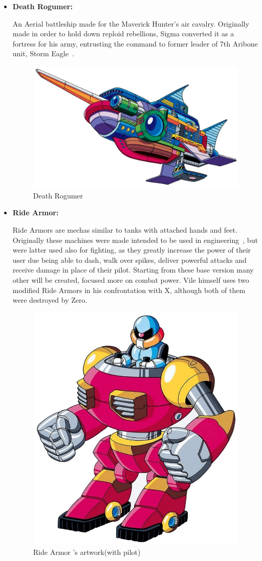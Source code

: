 \begin{itemize}
	\item \hypertarget{veichle:Death_Rogumer}{\textbf{Death Rogumer:}}
	An Aerial battleship made for the Maverick Hunter's air cavalry. Originally made in order to hold down reploid rebellions, Sigma converted it as a fortress 
	for his army, entrusting the command to former leader of 7th Aribone unit, Storm Eagle~\cite{wayback:X_resources}.
	\begin{figure}[htp]
		\centering
		\includegraphics[width=\linewidth]{figures/X1/Storm_eagle/DeathRogumer.jpg}
		\caption{Death Rogumer}
	\end{figure}
	\item \hypertarget{veichle:Ride_Armor}{\textbf{Ride Armor:}}
	Ride Armors are mechas similar to tanks with attached hands and feet. Originally these machines were made intended to be used in engineering~\cite{wayback:X_resources}, but were latter used also for fighting, as they greatly increase the power of their user due being able to dash, walk over spikes, deliver powerful attacks and receive damage in place of 
	their pilot. Starting from these base version many other will be created, focused more on combat power. Vile himself uses two modified Ride Armors in his confrontation with X, although both of them were destroyed by Zero.
	\begin{figure}[htp]
		\centering
		\includegraphics[width=0.5\linewidth]{figures/X1/Enemies/ArmorSoldier.jpg}
		\caption{Ride Armor 's artwork(with pilot)}
	\end{figure}
	
\end{itemize}